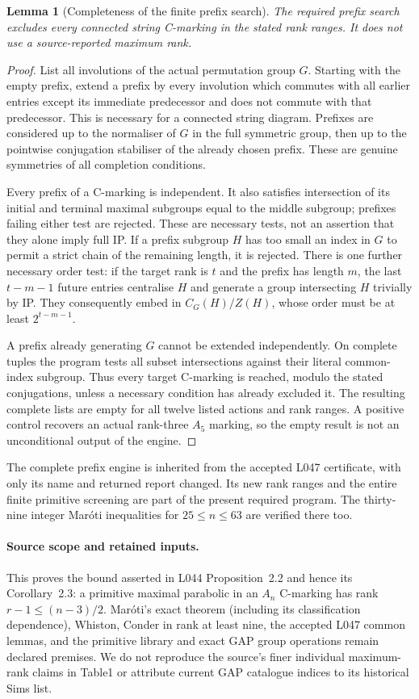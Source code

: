 \documentclass[11pt,a4paper]{article}
\newtheorem{lemma}[proposition]{Lemma}
\begin{document}
\begin{lemma}[Completeness of the finite prefix search]
The required prefix search excludes every connected string
C-marking in the stated rank ranges. It does not use a
source-reported maximum rank.
\end{lemma}
\begin{proof}
List all involutions of the actual permutation group $G$. Starting
with the empty prefix, extend a prefix by every involution which
commutes with all earlier entries except its immediate predecessor
and does not commute with that predecessor. This is necessary for
a connected string diagram. Prefixes are considered up to the
normaliser of $G$ in the full symmetric group, then up to the
pointwise conjugation stabiliser of the already chosen prefix.
These are genuine symmetries of all completion conditions.

Every prefix of a C-marking is independent. It also satisfies
intersection of its initial and terminal maximal subgroups equal
to the middle subgroup; prefixes failing either test are rejected.
These are necessary tests, not an assertion that they alone imply
full IP. If a prefix subgroup $H$ has too small an index in $G$
to permit a strict chain of the remaining length, it is rejected.
There is one further necessary order test: if the target rank is
$t$ and the prefix has length $m$, the last $t-m-1$ future entries
centralise $H$ and generate a group intersecting $H$ trivially by
IP. They consequently embed in
$C_G(H)/Z(H)$, whose order must be at least $2^{t-m-1}$.

A prefix already generating $G$ cannot be extended independently.
On complete tuples the program tests all subset intersections
against their literal common-index subgroup. Thus every target
C-marking is reached, modulo the stated conjugations, unless a
necessary condition has already excluded it. The resulting complete
lists are empty for all twelve listed actions and rank ranges.
A positive control recovers an actual rank-three $A_5$ marking,
so the empty result is not an unconditional output of the engine.
\end{proof}

The complete prefix engine is inherited from the accepted L047
certificate, with only its name and returned report changed. Its
new rank ranges and the entire finite primitive screening are part
of the present required program. The thirty-nine integer Mar\'oti
inequalities for $25\le n\le63$ are verified there too.

\paragraph{Source scope and retained inputs.}
This proves the bound asserted in L044 Proposition~2.2 and hence
its Corollary~2.3: a primitive maximal parabolic in an $A_n$
C-marking has rank $r-1\le(n-3)/2$.
Mar\'oti's exact theorem (including its classification dependence),
Whiston, Conder in rank at least nine, the accepted L047 common
lemmas, and the primitive library and exact GAP group operations
remain declared premises. We do not reproduce the source's finer
individual maximum-rank claims in Table1 or attribute current
GAP catalogue indices to its historical Sims list.
\end{document}
